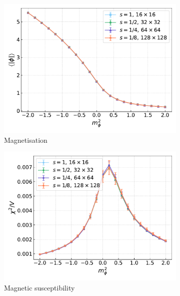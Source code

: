 \begin{figure}[hbp]
    \centering
    \begin{subfigure}[b]{0.47\textwidth}
        \includegraphics[width=\textwidth]{figures/cooling/mass_scan/magnetisation.pdf}
        \caption{Magnetisation}
    \end{subfigure}
    \hfill
    \begin{subfigure}[b]{0.47\textwidth}
        \includegraphics[width=\textwidth]{figures/cooling/mass_scan/susceptibility.pdf}
        \caption{Magnetic susceptibility}
    \end{subfigure}
    \begin{subfigure}[b]{0.47\textwidth}

\end{subfigure}
\end{figure}
